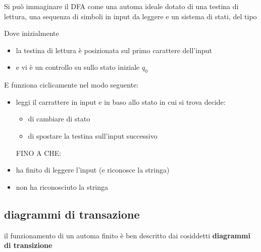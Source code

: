 Si può immaginare il DFA come una automa ideale dotato di una testina di lettura, una sequenza di simboli in input da leggere e un sistema di stati, del tipo


Dove inizialmente 
\begin{itemize}
    \item la testina di lettura è posizionata sul primo carattere dell'input
    \item e vi è un controllo su sullo stato iniziale $q_0$
\end{itemize}

E funziona ciclicamente nel modo seguente:
\begin{itemize}
    \item leggi il carrattere in input e in baso allo stato in cui si trova decide:
    \begin{itemize}
        \item di cambiare di stato
        \item di spostare la testina sull'input successivo
    \end{itemize}
    FINO A CHE:
    \item ha finito di leggere l'input (e riconosce la stringa)
    \item non ha riconosciuto la stringa 
\end{itemize}

\subsection{diagrammi di transazione}
il funzionamento di un automa finito  è ben descritto dai cosiddetti \textbf{diagrammi di transizione}

\begin{center}
\end{center}

